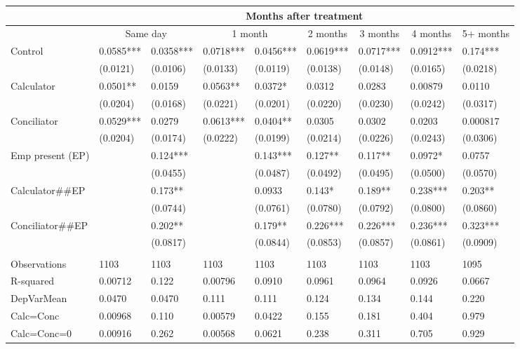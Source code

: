 \begin{tabular}{lllllllll}
      & \multicolumn{8}{c}{Months after treatment} \\
\midrule
      & \multicolumn{2}{c}{Same day} & \multicolumn{2}{c}{1 month} & \multicolumn{1}{c}{2 months} & \multicolumn{1}{c}{3 months} & \multicolumn{1}{c}{4 months} & \multicolumn{1}{c}{5+ months} \\
\midrule
\midrule
Control & 0.0585*** & 0.0358*** & 0.0718*** & 0.0456*** & 0.0619*** & 0.0717*** & 0.0912*** & 0.174*** \\
      & (0.0121) & (0.0106) & (0.0133) & (0.0119) & (0.0138) & (0.0148) & (0.0165) & (0.0218) \\
Calculator & 0.0501** & 0.0159 & 0.0563** & 0.0372* & 0.0312 & 0.0283 & 0.00879 & 0.0110 \\
      & (0.0204) & (0.0168) & (0.0221) & (0.0201) & (0.0220) & (0.0230) & (0.0242) & (0.0317) \\
Conciliator & 0.0529*** & 0.0279 & 0.0613*** & 0.0404** & 0.0305 & 0.0302 & 0.0203 & 0.000817 \\
      & (0.0204) & (0.0174) & (0.0222) & (0.0199) & (0.0214) & (0.0226) & (0.0243) & (0.0306) \\
Emp present (EP) &       & 0.124*** &       & 0.143*** & 0.127** & 0.117** & 0.0972* & 0.0757 \\
      &       & (0.0455) &       & (0.0487) & (0.0492) & (0.0495) & (0.0500) & (0.0570) \\
Calculator\#\#EP &       & 0.173** &       & 0.0933 & 0.143* & 0.189** & 0.238*** & 0.203** \\
      &       & (0.0744) &       & (0.0761) & (0.0780) & (0.0792) & (0.0800) & (0.0860) \\
Conciliator\#\#EP &       & 0.202** &       & 0.179** & 0.226*** & 0.226*** & 0.236*** & 0.323*** \\
      &       & (0.0817) &       & (0.0844) & (0.0853) & (0.0857) & (0.0861) & (0.0909) \\
      &       &       &       &       &       &       &       &  \\
\midrule
Observations & 1103  & 1103  & 1103  & 1103  & 1103  & 1103  & 1103  & 1095 \\
R-squared & 0.00712 & 0.122 & 0.00796 & 0.0910 & 0.0961 & 0.0964 & 0.0926 & 0.0667 \\
DepVarMean & 0.0470 & 0.0470 & 0.111 & 0.111 & 0.124 & 0.134 & 0.144 & 0.220 \\
Calc=Conc & 0.00968 & 0.110 & 0.00579 & 0.0422 & 0.155 & 0.181 & 0.404 & 0.979 \\
Calc=Conc=0 & 0.00916 & 0.262 & 0.00568 & 0.0621 & 0.238 & 0.311 & 0.705 & 0.929 \\
\bottomrule
\bottomrule
\end{tabular}%
